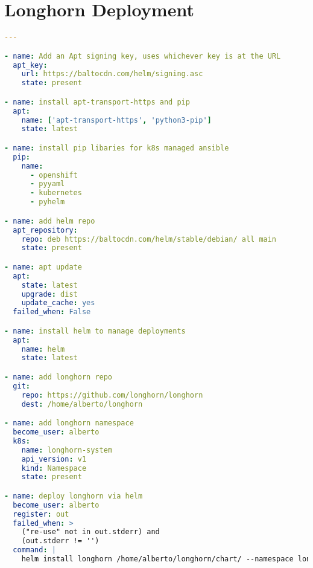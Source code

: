 \section{Longhorn Deployment}
\label{app:longhorn}
\begin{lstlisting}[language=yaml, caption={longhorn role}]
---

- name: Add an Apt signing key, uses whichever key is at the URL
  apt_key:
    url: https://baltocdn.com/helm/signing.asc
    state: present

- name: install apt-transport-https and pip
  apt:
    name: ['apt-transport-https', 'python3-pip']
    state: latest

- name: install pip libaries for k8s managed ansible
  pip:
    name:
      - openshift  
      - pyyaml
      - kubernetes
      - pyhelm

- name: add helm repo
  apt_repository:
    repo: deb https://baltocdn.com/helm/stable/debian/ all main
    state: present

- name: apt update
  apt:
    state: latest
    upgrade: dist
    update_cache: yes
  failed_when: False

- name: install helm to manage deployments
  apt:
    name: helm
    state: latest

- name: add longhorn repo
  git:
    repo: https://github.com/longhorn/longhorn
    dest: /home/alberto/longhorn

- name: add longhorn namespace
  become_user: alberto
  k8s:
    name: longhorn-system
    api_version: v1
    kind: Namespace
    state: present

- name: deploy longhorn via helm
  become_user: alberto
  register: out
  failed_when: >
    ("re-use" not in out.stderr) and
    (out.stderr != '')
  command: |
    helm install longhorn /home/alberto/longhorn/chart/ --namespace longhorn-system
\end{lstlisting}

